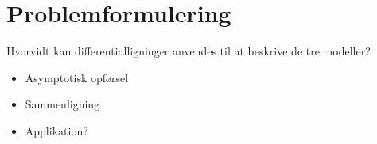 \section{Problemformulering}



Hvorvidt kan differentialligninger anvendes til at beskrive de tre modeller?

\begin{itemize}
    \item Asymptotisk opførsel
    \item Sammenligning
    \item Applikation?
\end{itemize}






